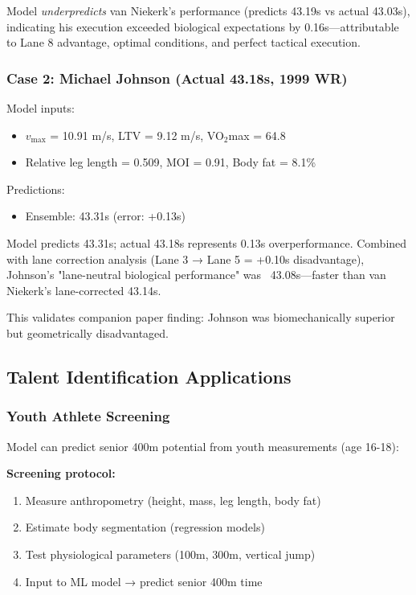 Model \textit{underpredicts} van Niekerk's performance (predicts 43.19s vs actual 43.03s), indicating his execution exceeded biological expectations by 0.16s—attributable to Lane 8 advantage, optimal conditions, and perfect tactical execution.

\subsubsection{Case 2: Michael Johnson (Actual 43.18s, 1999 WR)}

Model inputs:
\begin{itemize}
    \item $v_{\max}$ = 10.91 m/s, LTV = 9.12 m/s, VO$_2$max = 64.8
    \item Relative leg length = 0.509, MOI = 0.91, Body fat = 8.1\%
\end{itemize}

Predictions:
\begin{itemize}
    \item Ensemble: 43.31s (error: +0.13s)
\end{itemize}

Model predicts 43.31s; actual 43.18s represents 0.13s overperformance. Combined with lane correction analysis (Lane 3 → Lane 5 = +0.10s disadvantage), Johnson's "lane-neutral biological performance" was ~43.08s—faster than van Niekerk's lane-corrected 43.14s.

This validates companion paper finding: Johnson was biomechanically superior but geometrically disadvantaged.

\subsection{Talent Identification Applications}

\subsubsection{Youth Athlete Screening}

Model can predict senior 400m potential from youth measurements (age 16-18):

\textbf{Screening protocol:}
\begin{enumerate}
    \item Measure anthropometry (height, mass, leg length, body fat)
    \item Estimate body segmentation (regression models)
    \item Test physiological parameters (100m, 300m, vertical jump)
    \item Input to ML model → predict senior 400m time
\end{enumerate}

